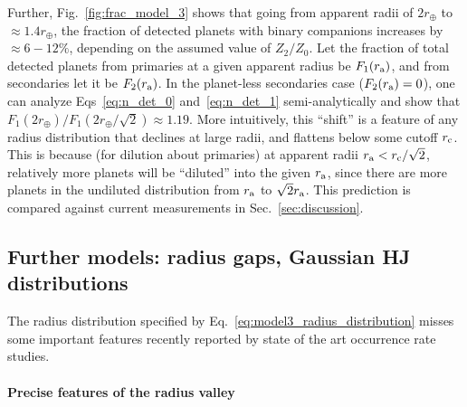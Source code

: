 \documentclass[12pt,modern]{aastex61}
\renewcommand{\a}{_{\rm a}}
\begin{document}
Further, Fig.~\ref{fig:frac_model_3} shows that going from apparent 
radii of $2r_\oplus$ to $\approx 1.4r_\oplus$, the fraction of detected 
planets with binary companions increases by $\approx 6-12\%$, depending on the 
assumed value of $Z_2/Z_0$.
Let the fraction of total detected planets from primaries at a given 
apparent radius be $F_1(r\a)$, and from secondaries let it be $F_2(r\a)$.
In the planet-less secondaries case ($F_2(r\a)=0$), one can 
analyze Eqs~\ref{eq:n_det_0} and~\ref{eq:n_det_1} semi-analytically and show 
that $F_1(2r_\oplus)/F_1(2r_\oplus/\sqrt{2}) \approx 1.19$.
More intuitively, this ``shift'' is a feature of any radius distribution that 
declines at large radii, and flattens below some cutoff $r_{\rm c}$.
This is because (for dilution about primaries)
at apparent radii $r\a < r_{\rm c}/\sqrt{2}$, relatively more planets will be 
``diluted'' into the given $r\a$, since there are more planets in 
the undiluted distribution from $r\a$ to $\sqrt{2}r\a$.
This prediction is compared against current measurements in 
Sec.~\ref{sec:discussion}.



\subsection{Further models: radius gaps, Gaussian HJ distributions}
\label{sec:further_models}

The radius distribution specified by Eq.~\ref{eq:model3_radius_distribution} 
misses some important features recently reported by state of the art 
occurrence rate studies.

\paragraph{Precise features of the radius valley}
\end{document}
